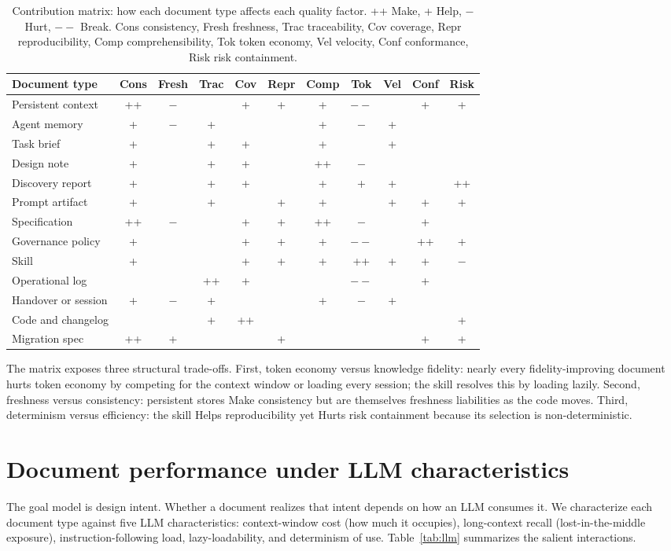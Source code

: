 \documentclass[sigconf]{acmart}
\begin{document}
\begin{table}[t]
\caption{Contribution matrix: how each document type affects each quality factor. ++ Make, + Help, $-$ Hurt, $--$ Break. Cons consistency, Fresh freshness, Trac traceability, Cov coverage, Repr reproducibility, Comp comprehensibility, Tok token economy, Vel velocity, Conf conformance, Risk risk containment.}
\label{tab:matrix}
\small
\begin{tabular}{@{}lcccccccccc@{}}
\toprule
Document type & Cons & Fresh & Trac & Cov & Repr & Comp & Tok & Vel & Conf & Risk \\
\midrule
Persistent context & ++ & $-$ & & + & + & + & $--$ & & + & + \\
Agent memory & + & $-$ & + & & & + & $-$ & + & & \\
Task brief & + & & + & + & & + & & + & & \\
Design note & + & & + & + & & ++ & $-$ & & & \\
Discovery report & + & & + & + & & + & + & + & & ++ \\
Prompt artifact & + & & + & & + & + & & + & + & + \\
Specification & ++ & $-$ & & + & + & ++ & $-$ & & + & \\
Governance policy & + & & & + & + & + & $--$ & & ++ & + \\
Skill & + & & & + & + & + & ++ & + & + & $-$ \\
Operational log & & & ++ & + & & & $--$ & & + & \\
Handover or session & + & $-$ & + & & & + & $-$ & + & & \\
Code and changelog & & & + & ++ & & & & & & + \\
Migration spec & ++ & + & & & + & & & & + & + \\
\bottomrule
\end{tabular}
\end{table}

The matrix exposes three structural trade-offs. First, token economy versus knowledge fidelity: nearly every fidelity-improving document hurts token economy by competing for the context window or loading every session; the skill resolves this by loading lazily. Second, freshness versus consistency: persistent stores Make consistency but are themselves freshness liabilities as the code moves. Third, determinism versus efficiency: the skill Helps reproducibility yet Hurts risk containment because its selection is non-deterministic.

\section{Document performance under LLM characteristics}
The goal model is design intent. Whether a document realizes that intent depends on how an LLM consumes it. We characterize each document type against five LLM characteristics: context-window cost (how much it occupies), long-context recall (lost-in-the-middle exposure), instruction-following load, lazy-loadability, and determinism of use. Table~\ref{tab:llm} summarizes the salient interactions.
\end{document}
